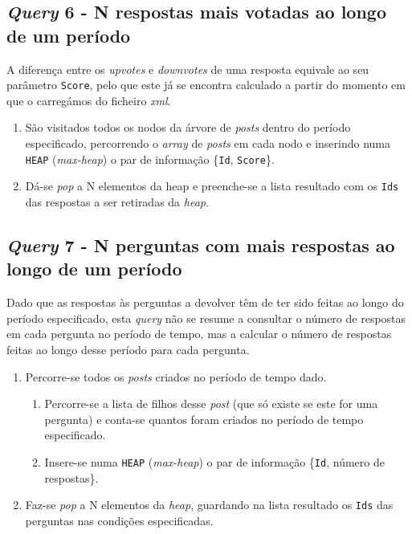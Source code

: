 \documentclass[10pt]{article}
\begin{document}
	\subsection*{\textit{Query} 6 - N respostas mais votadas ao longo de um período}
			A diferença entre os \textit{upvotes} e \textit{downvotes} de uma resposta
		equivale ao seu parâmetro \texttt{Score}, pelo que este já se encontra calculado
		a partir do momento em que o carregámos do ficheiro \textit{xml}.
			\begin{enumerate}
				\item São visitados todos os nodos da árvore de \textit{posts} dentro
					do período especificado, percorrendo o \textit{array} de \textit{posts}
					em cada nodo e inserindo numa \texttt{HEAP} (\textit{max-heap}) o par de
					informação \{\texttt{Id}, \texttt{Score}\}.
				\item Dá-se \textit{pop} a N elementos da heap e preenche-se a lista 
					resultado com os \texttt{Ids} das respostas a ser retiradas da \textit{heap}.
			\end{enumerate}
	\subsection*{\textit{Query} 7 - N perguntas com mais respostas ao longo de um período}
			Dado que as respostas às perguntas a devolver têm de ter sido feitas ao longo
		do período especificado, esta \textit{query} não se resume a consultar o número
		de respostas em cada pergunta no período de tempo, mas a calcular o número de 
		respostas feitas ao longo desse período para cada pergunta.
			\begin{enumerate}
				\item Percorre-se todos os \textit{posts} criados no período de tempo
					dado.
					\begin{enumerate}
						\item Percorre-se a lista de filhos desse \textit{post} (que só
							existe se este for uma pergunta) e conta-se quantos foram
							criados no período de tempo especificado.
						\item Insere-se numa \texttt{HEAP} (\textit{max-heap}) o par de  
							informação \{\texttt{Id}, número de respostas\}.
					\end{enumerate}
				\item Faz-se \textit{pop} a N elementos da \textit{heap}, guardando 
					na lista resultado os \texttt{Ids} das perguntas nas condições
					especificadas.
			\end{enumerate}
\end{document}
